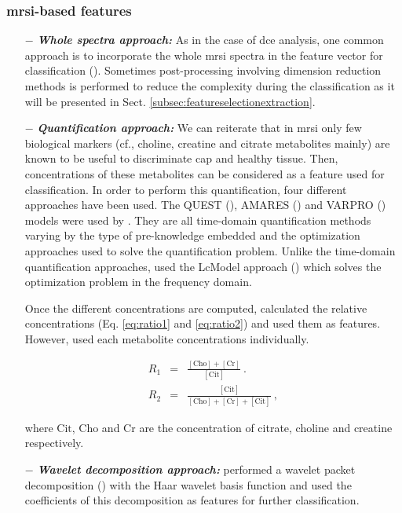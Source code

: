 \subsubsection{\ac{mrsi}-based features}

\begin{enumerate}[leftmargin=*]

\item[$-$] \textbf{\textit{Whole spectra approach:}} As in the case of \ac{dce} analysis, one common approach is to incorporate the whole \ac{mrsi} spectra in the feature vector for classification (\cite{Kelm2007,Parfait2012,Tiwari2007,Tiwari2009,Tiwari2013,Tiwari2009a,Tiwari2010,Viswanath2008a,Matulewicz2013}). Sometimes post-processing involving dimension reduction methods is performed to reduce the complexity during the classification as it will be presented in Sect. \ref{subsec:featureselectionextraction}.

\item[$-$] \textbf{\textit{Quantification approach:}} We can reiterate that in \ac{mrsi} only few biological markers (cf., choline, creatine and citrate metabolites mainly) are known to be useful to discriminate \ac{cap} and healthy tissue. Then, concentrations of these metabolites can be considered as a feature used for classification. In order to perform this quantification, four different approaches have been used. The QUEST (\cite{Ratiney2005}), AMARES (\cite{Vanhamme1997}) and VARPRO (\cite{Coleman1993}) models were used by \cite{Kelm2007}. They are all time-domain quantification methods varying by the type of pre-knowledge embedded and the optimization approaches used to solve the quantification problem. Unlike the time-domain quantification approaches, \cite{Parfait2012} used the LcModel approach (\cite{Provencher1993}) which solves the optimization problem in the frequency domain.

  Once the different concentrations are computed, \cite{Kelm2007} calculated the relative concentrations (Eq. \eqref{eq:ratio1} and \eqref{eq:ratio2}) and used them as features. However, \cite{Parfait2012} used each metabolite concentrations individually.

  \begin{eqnarray}
    R_1 & = & \frac{ [ \text{Cho} ] + [ \text{Cr} ]}{[ \text{Cit} ]} \ . \label{eq:ratio1} \\
    R_2 & = & \frac{[ \text{Cit} ]}{[\text{Cho}]+[\text{Cr}]+[\text{Cit}]} \ , \label{eq:ratio2}
  \end{eqnarray}

  \noindent where $\text{Cit}$, $\text{Cho}$ and $\text{Cr}$ are the concentration of citrate, choline and creatine respectively.

\item[$-$] \textbf{\textit{Wavelet decomposition approach:}} \cite{Tiwari2012} performed a wavelet packet decomposition (\cite{Coifman1992}) with the Haar wavelet basis function and used the coefficients of this decomposition as features for further classification.

\end{enumerate}

